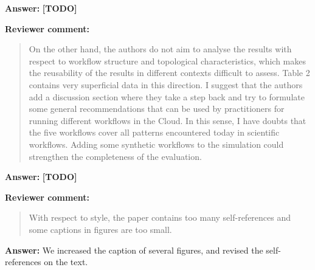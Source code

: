 \documentclass{letter}
\newenvironment{review}%
{\textbf{Reviewer comment:}\begin{quote}}%
{\end{quote}}%
\newcommand{\todo}[1]{%
      \color{red}\textbf{[TODO]} #1\color{black}}
\newcommand{\answer}[1]{%
      \textbf{Answer:} #1}
\begin{document}
\begin{letter}{}
\answer{\todo{}}



\begin{review}
On the other hand, the authors do not aim to analyse the results with respect to workflow structure and topological characteristics, which makes the reusability of the results in different contexts difficult to assess. Table 2 contains very superficial data in this direction. I suggest that the authors add a discussion section where they take a step back and try to formulate some general recommendations that can be used by practitioners for running different workflows in the Cloud. In this sense, I have doubts that the five workflows cover all patterns encountered today in scientific workflows. Adding some synthetic workflows to the simulation could strengthen the completeness of the evaluation.
\end{review}

\answer{\todo{}}



\begin{review}
With respect to style, the paper contains too many self-references and some captions in figures are too small.
\end{review}

\answer{We increased the caption of several figures, and revised the self-references on the text.}



\end{letter}
\end{document}
